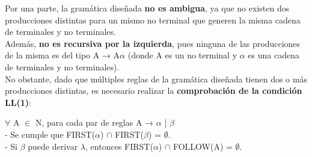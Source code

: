 Por una parte, la gramática diseñada \textbf{no es ambigua}, ya que no existen dos producciones distintas para un mismo no terminal que generen la misma cadena de terminales y no terminales.\\

Además, \textbf{no es recursiva por la izquierda}, pues ninguna de las producciones de la misma es del tipo A → A$\alpha$ (donde A es un no terminal y $\alpha$ es una cadena de terminales y no terminales).\\

No obstante, dado que múltiples reglas de la gramática diseñada tienen dos o más producciones distintas, es necesario realizar la \textbf{comprobación de la condición LL(1)}:
\begin{center}
    $\forall$ A $\in$ N, para cada par de reglas A → $\alpha$ | $\beta$\\
    - Se cumple que FIRST($\alpha$) $\cap$ FIRST($\beta$) = $\emptyset$.\\
    - Si $\beta$ puede derivar $\lambda$, entonces FIRST($\alpha$) $\cap$ FOLLOW(A) = $\emptyset$.\\
\end{center}

